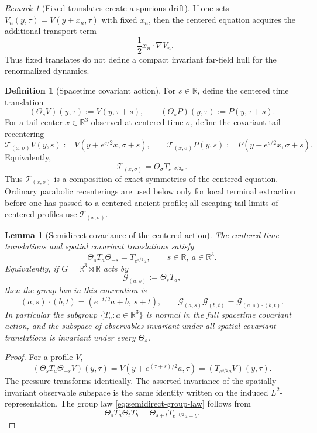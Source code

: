 \documentclass[11pt]{amsart}
\numberwithin{equation}{section}
\theoremstyle{plain}
\newtheorem{lemma}[lemma]{Lemma}
\theoremstyle{definition}
\newtheorem{definition}[definition]{Definition}
\theoremstyle{remark}
\newtheorem{remark}[remark]{Remark}
\newcommand{\R}{\mathbb R}
\begin{document}
\begin{remark}[Fixed translates create a spurious drift]
\label{rem:raw-translates}
If one sets \(V_n(y,\tau)=V(y+x_n,\tau)\) with fixed \(x_n\), then the centered
equation acquires the additional transport term
\[
   -\frac12 x_n\cdot\nabla V_n .
\]
Thus fixed translates do not define a compact invariant far-field hull for the
renormalized dynamics.
\end{remark}

\begin{definition}[Spacetime covariant action]
\label{def:spacetime-covariant-action}
For \(s\in\R\), define the centered time translation
\[
   (\Theta_sV)(y,\tau):=V(y,\tau+s),
   \qquad
   (\Theta_sP)(y,\tau):=P(y,\tau+s).
\]
For a tail center \(x\in\R^3\) observed at centered time \(\sigma\), define the
covariant tail recentering
\[
   \mathscr T_{(x,\sigma)}V(y,s)
   :=V(y+e^{s/2}x,\sigma+s),
   \qquad
   \mathscr T_{(x,\sigma)}P(y,s)
   :=P(y+e^{s/2}x,\sigma+s).
\]
Equivalently,
\[
   \mathscr T_{(x,\sigma)}
   =
   \Theta_\sigma T_{e^{-\sigma/2}x}.
\]
Thus \(\mathscr T_{(x,\sigma)}\) is a composition of exact symmetries of the
centered equation.  Ordinary parabolic recenterings are used below only for local
terminal extraction before one has passed to a centered ancient profile; all
escaping tail limits of centered profiles use \(\mathscr T_{(x,\sigma)}\).
\end{definition}

\begin{lemma}[Semidirect covariance of the centered action]
\label{lem:semidirect-covariance}
The centered time translations and spatial covariant translations satisfy
\[
   \Theta_sT_a\Theta_{-s}=T_{e^{s/2}a},
   \qquad s\in\R,\ a\in\R^3.
\]
Equivalently, if \(G=\mathbb R^3\rtimes\mathbb R\) acts by
\[
   \mathscr G_{(a,s)}:=\Theta_sT_a,
\]
then the group law in this convention is
\begin{equation}\label{eq:semidirect-group-law}
   (a,s)\cdot(b,t)
   =
   (e^{-t/2}a+b,\ s+t),
   \qquad
   \mathscr G_{(a,s)}\mathscr G_{(b,t)}
   =
   \mathscr G_{(a,s)\cdot(b,t)} .
\end{equation}
In particular the subgroup \(\{T_a:a\in\R^3\}\) is normal in the full
spacetime covariant action, and the subspace of observables invariant under all
spatial covariant translations is invariant under every \(\Theta_s\).
\end{lemma}

\begin{proof}
For a profile \(V\),
\[
   (\Theta_sT_a\Theta_{-s}V)(y,\tau)
   =
   V(y+e^{(\tau+s)/2}a,\tau)
   =
   (T_{e^{s/2}a}V)(y,\tau).
\]
The pressure transforms identically.  The asserted invariance of the
spatially invariant observable subspace is the same identity written on the
induced \(L^2\)-representation.
The group law \eqref{eq:semidirect-group-law} follows from
\[
   \Theta_sT_a\Theta_tT_b
   =
   \Theta_{s+t}T_{e^{-t/2}a+b}.
\]
\end{proof}
\end{document}
